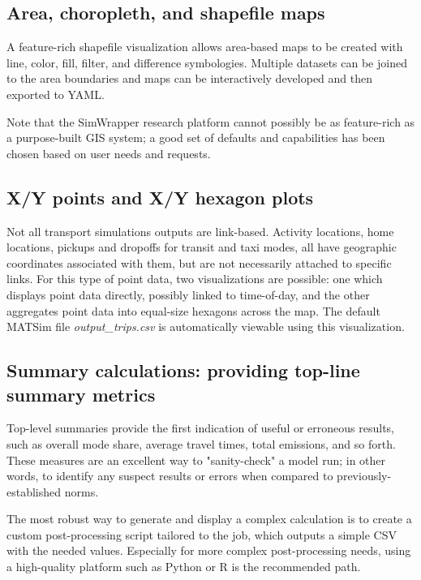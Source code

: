 \documentclass[3p,times,procedia]{elsarticle}
\begin{document}
\subsection{Area, choropleth, and shapefile maps}

A feature-rich shapefile visualization allows area-based maps to be created with line, color, fill, filter, and difference symbologies. Multiple datasets can be joined to the area boundaries and maps can be interactively developed and then exported to YAML.

Note that the SimWrapper research platform cannot possibly be as feature-rich as a purpose-built GIS system; a good set of defaults and capabilities has been chosen based on user needs and requests.

\subsection{X/Y points and X/Y hexagon plots}

Not all transport simulations outputs are link-based. Activity locations, home locations, pickups and dropoffs for transit and taxi modes, all have geographic coordinates associated with them, but are not necessarily attached to specific links. For this type of point data, two visualizations are possible: one which displays point data directly, possibly linked to time-of-day, and the other aggregates point data into equal-size hexagons across the map. The default MATSim file \textit{output\_trips.csv} is automatically viewable using this visualization.

\subsection{Summary calculations: providing top-line summary metrics}

Top-level summaries provide the first indication of useful or erroneous results, such as overall mode share, average travel times, total emissions, and so forth. These measures are an excellent way to "sanity-check" a model run; in other words, to identify any suspect results or errors when compared to previously-established norms.

The most robust way to generate and display a complex calculation is to create a custom post-processing script tailored to the job, which outputs a simple CSV with the needed values. Especially for more complex post-processing needs, using a high-quality platform such as Python or R is the recommended path.
\end{document}
